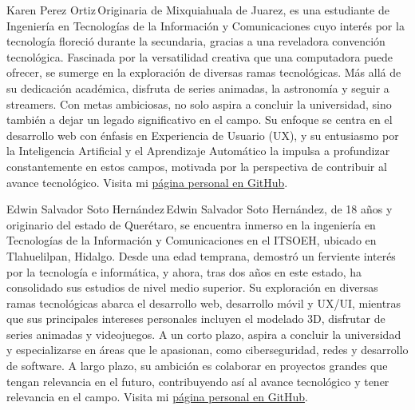 \documentclass{IEEEcsmag}
\begin{document}
\begin{IEEEbiography}{Karen Perez Ortiz}{\,}Originaria de Mixquiahuala de Juarez, es una estudiante de Ingeniería en Tecnologías de la Información y Comunicaciones cuyo interés por la tecnología floreció durante la secundaria, gracias a una reveladora convención tecnológica. Fascinada por la versatilidad creativa que una computadora puede ofrecer, se sumerge en la exploración de diversas ramas tecnológicas. Más allá de su dedicación académica, disfruta de series animadas, la astronomía y seguir a streamers. Con metas ambiciosas, no solo aspira a concluir la universidad, sino también a dejar un legado significativo en el campo. Su enfoque se centra en el desarrollo web con énfasis en Experiencia de Usuario (UX), y su entusiasmo por la Inteligencia Artificial y el Aprendizaje Automático la impulsa a profundizar constantemente en estos campos, motivada por la perspectiva de contribuir al avance tecnológico. Visita mi \href{https://karenperezor.github.io/}{página personal en GitHub}.
\end{IEEEbiography}
\begin{IEEEbiography}{Edwin Salvador Soto Hernández}{\,}Edwin Salvador Soto Hernández, de 18 años y originario del estado de Querétaro, se encuentra inmerso en la ingeniería en Tecnologías de la Información y Comunicaciones en el ITSOEH, ubicado en Tlahuelilpan, Hidalgo. Desde una edad temprana, demostró un ferviente interés por la tecnología e informática, y ahora, tras dos años en este estado, ha consolidado sus estudios de nivel medio superior. Su exploración en diversas ramas tecnológicas abarca el desarrollo web, desarrollo móvil y UX/UI, mientras que sus principales intereses personales incluyen el modelado 3D, disfrutar de series animadas y videojuegos. A un corto plazo, aspira a concluir la universidad y especializarse en áreas que le apasionan, como ciberseguridad, redes y desarrollo de software. A largo plazo, su ambición es colaborar en proyectos grandes que tengan relevancia en el futuro, contribuyendo así al avance tecnológico y tener relevancia en el campo. Visita mi \href{https://edwinsotohz.github.io/}{página personal en GitHub}.
\end{IEEEbiography}
\end{document}
